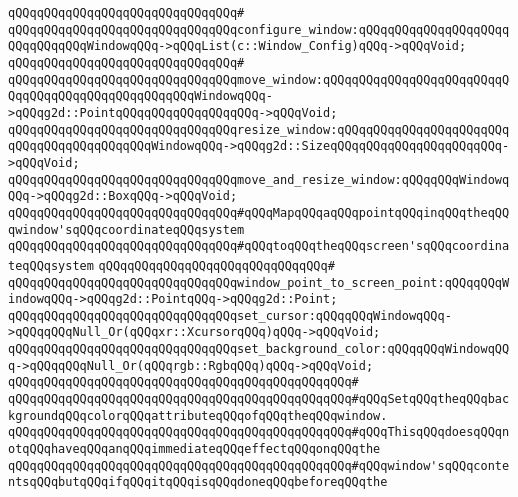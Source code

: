 \verb|qQQqqQQqqQQqqQQqqQQqqQQqqQQqqQQq#|\newline
\verb|qQQqqQQqqQQqqQQqqQQqqQQqqQQqqQQqconfigure_window:qQQqqQQqqQQqqQQqqQQqqQQqqQQqqQQqWindowqQQq->qQQqList(c::Window_Config)qQQq->qQQqVoid;|\newline
\verb|qQQqqQQqqQQqqQQqqQQqqQQqqQQqqQQq#|\newline
\verb|qQQqqQQqqQQqqQQqqQQqqQQqqQQqqQQqmove_window:qQQqqQQqqQQqqQQqqQQqqQQqqQQqqQQqqQQqqQQqqQQqqQQqqQQqWindowqQQq->qQQqg2d::PointqQQqqQQqqQQqqQQqqQQq->qQQqVoid;|\newline
\verb|qQQqqQQqqQQqqQQqqQQqqQQqqQQqqQQqresize_window:qQQqqQQqqQQqqQQqqQQqqQQqqQQqqQQqqQQqqQQqqQQqWindowqQQq->qQQqg2d::SizeqQQqqQQqqQQqqQQqqQQqqQQq->qQQqVoid;|\newline
\verb|qQQqqQQqqQQqqQQqqQQqqQQqqQQqqQQqmove_and_resize_window:qQQqqQQqWindowqQQq->qQQqg2d::BoxqQQq->qQQqVoid;|\newline
\newline
\verb|qQQqqQQqqQQqqQQqqQQqqQQqqQQqqQQq#qQQqMapqQQqaqQQqpointqQQqinqQQqtheqQQqwindow'sqQQqcoordinateqQQqsystem|\newline
\verb|qQQqqQQqqQQqqQQqqQQqqQQqqQQqqQQq#qQQqtoqQQqtheqQQqscreen'sqQQqcoordinateqQQqsystem|\newline
\verb|qQQqqQQqqQQqqQQqqQQqqQQqqQQqqQQq#|\newline
\verb|qQQqqQQqqQQqqQQqqQQqqQQqqQQqqQQqwindow_point_to_screen_point:qQQqqQQqWindowqQQq->qQQqg2d::PointqQQq->qQQqg2d::Point;|\newline
\newline
\verb|qQQqqQQqqQQqqQQqqQQqqQQqqQQqqQQqset_cursor:qQQqqQQqWindowqQQq->qQQqqQQqNull_Or(qQQqxr::XcursorqQQq)qQQq->qQQqVoid;|\newline
\newline
\verb|qQQqqQQqqQQqqQQqqQQqqQQqqQQqqQQqset_background_color:qQQqqQQqWindowqQQq->qQQqqQQqNull_Or(qQQqrgb::RgbqQQq)qQQq->qQQqVoid;|\newline
\verb|qQQqqQQqqQQqqQQqqQQqqQQqqQQqqQQqqQQqqQQqqQQqqQQq#|\newline
\verb|qQQqqQQqqQQqqQQqqQQqqQQqqQQqqQQqqQQqqQQqqQQqqQQq#qQQqSetqQQqtheqQQqbackgroundqQQqcolorqQQqattributeqQQqofqQQqtheqQQqwindow.|\newline
\verb|qQQqqQQqqQQqqQQqqQQqqQQqqQQqqQQqqQQqqQQqqQQqqQQq#qQQqThisqQQqdoesqQQqnotqQQqhaveqQQqanqQQqimmediateqQQqeffectqQQqonqQQqthe|\newline
\verb|qQQqqQQqqQQqqQQqqQQqqQQqqQQqqQQqqQQqqQQqqQQqqQQq#qQQqwindow'sqQQqcontentsqQQqbutqQQqifqQQqitqQQqisqQQqdoneqQQqbeforeqQQqthe|\newline
